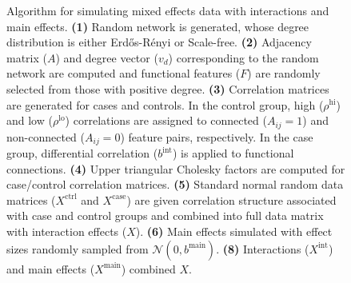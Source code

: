 \documentclass[10pt,letterpaper]{article}
\begin{document}
\begin{figure}[H]
 \centering
 \caption{Algorithm for simulating mixed effects data with interactions and main effects. \textbf{(1)} Random network is generated, whose degree distribution is either Erd\H{o}s-R\'{e}nyi or Scale-free. \textbf{(2)} Adjacency matrix ($A$) and degree vector ($v_d$) corresponding to the random network are computed and functional features ($F$) are randomly selected from those with positive degree. \textbf{(3)} Correlation matrices are generated for cases and controls. In the control group, high ($\rho^\text{hi}$) and low ($\rho^\text{lo}$) correlations are assigned to connected ($A_{ij}=1$) and non-connected ($A_{ij}=0$) feature pairs, respectively. In the case group, differential correlation ($b^\text{int}$) is applied to functional connections. \textbf{(4)} Upper triangular Cholesky factors are computed for case/control correlation matrices. \textbf{(5)} Standard normal random data matrices ($X^\text{ctrl}$ and $X^\text{case}$) are given correlation structure associated with case and control groups and combined into full data matrix with interaction effects ($X$). \textbf{(6)} Main effects simulated with effect sizes randomly sampled from $\mathcal{N}(0,b^\text{main})$. \textbf{(8)} Interactions ($X^\text{int}$) and main effects ($X^\text{main}$) combined $X$.}\label{fig:mixed_sim}
\end{figure}
\end{document}
